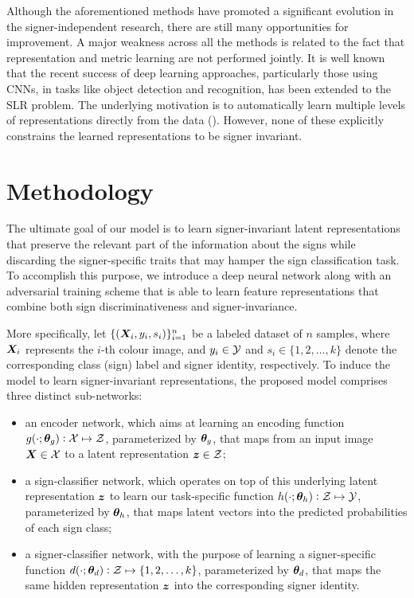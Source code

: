 Although the aforementioned methods have promoted a significant evolution in the signer-independent research, there are still many opportunities for improvement. A major weakness across all the methods is related to the fact that representation and metric learning are not performed jointly. It is well known that the recent success of deep learning approaches, particularly those using CNNs, in tasks like object detection and recognition, has been extended to the SLR problem. The underlying motivation is to automatically learn multiple levels of representations directly from the data (\citet{Pigou2015, Koller2016, Wu2016, Neverova2016, Kumar2017}). However, none of these explicitly constrains the learned representations to be signer invariant.

\section{Methodology}
\label{sec:adv_signer_inv_method}

The ultimate goal of our model is to learn signer-invariant latent representations that preserve the relevant part of the information about the signs while discarding the signer-specific traits that may hamper the sign classification task. To accomplish this purpose, we introduce a deep neural network along with an adversarial training scheme that is able to learn feature representations that combine both sign discriminativeness and signer-invariance.

More specifically, let $\{({\bm{X}}_{i},y_{i},s_{i})\}_{i=1}^{n}$ be a labeled dataset of $n$ samples, where ${\bm{X}}_{i}$ represents the $i$-th colour image, and $y_{i} \in {\mathcal{Y}}$ and $s_{i} \in \{1,2,\dots,k\}$ denote the corresponding class (sign) label and signer identity, respectively. To induce the model to learn signer-invariant representations, the proposed model comprises three distinct sub-networks:
\begin{itemize}
    \item an encoder network, which aims at learning an encoding function $g(\cdot;{\bm{\theta}}_g): {\mathcal{X}} \mapsto {\mathcal{Z}}$, parameterized by ${\bm{\theta}}_g$, that maps from an input image ${\bm{X}} \in {\mathcal{X}}$ to a latent representation ${\bm{z}} \in {\mathcal{Z}}$;
    \item a sign-classifier network, which operates on top of this underlying latent representation ${\bm{z}}$ to learn our task-specific function $h(\cdot; {\bm{\theta}}_h): {\mathcal{Z}} \mapsto {\mathcal{Y}}$, parameterized by ${\bm{\theta}}_h$, that maps latent vectors into the predicted probabilities of each sign class;
    \item a signer-classifier network, with the purpose of learning a signer-specific function $d(\cdot; {\bm{\theta}}_d): {\mathcal{Z}} \mapsto \{1,2,\dots,k\}$, parameterized by ${\bm{\theta}}_d$, that maps the same hidden representation ${\bm{z}}$ into the corresponding signer identity.
\end{itemize}

